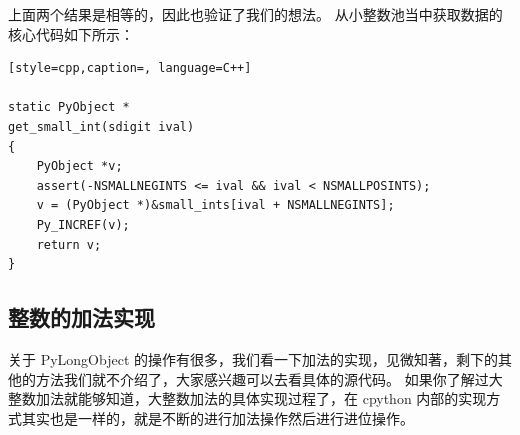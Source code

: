 上面两个结果是相等的，因此也验证了我们的想法。
从小整数池当中获取数据的核心代码如下所示：
\begin{lstlisting}[style=cpp,caption=, language=C++]

static PyObject *
get_small_int(sdigit ival)
{
    PyObject *v;
    assert(-NSMALLNEGINTS <= ival && ival < NSMALLPOSINTS);
    v = (PyObject *)&small_ints[ival + NSMALLNEGINTS];
    Py_INCREF(v);
    return v;
}
\end{lstlisting}
\subsection{整数的加法实现}
关于 PyLongObject 的操作有很多，我们看一下加法的实现，见微知著，剩下的其他的方法我们就不介绍了，大家感兴趣可以去看具体的源代码。
如果你了解过大整数加法就能够知道，大整数加法的具体实现过程了，在 cpython 内部的实现方式其实也是一样的，就是不断的进行加法操作然后进行进位操作。
